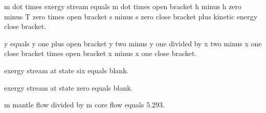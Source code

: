 m dot times exergy stream equals m dot times open bracket h minus h zero minus T zero times open bracket s minus s zero close bracket plus kinetic energy close bracket.  

y equals y one plus open bracket y two minus y one divided by x two minus x one close bracket times open bracket x minus x one close bracket.  

exergy stream at state six equals blank.  

exergy stream at state zero equals blank.  

m mantle flow divided by m core flow equals 5.293.